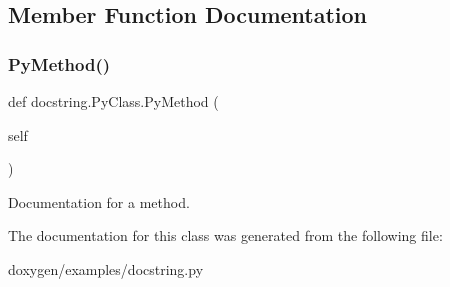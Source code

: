 \subsection{Member Function Documentation}
\mbox{\label{classdocstring_1_1_py_class_af092e1eacc10334e0e8630531a3473b4}} 
\subsubsection{\texorpdfstring{PyMethod()}{PyMethod()}}
{\footnotesize\ttfamily def docstring.\+Py\+Class.\+Py\+Method (\begin{DoxyParamCaption}\item[{}]{self }\end{DoxyParamCaption})}

\begin{DoxyVerb}Documentation for a method.\end{DoxyVerb}
 

The documentation for this class was generated from the following file\+:\begin{DoxyCompactItemize}
\item 
doxygen/examples/docstring.\+py\end{DoxyCompactItemize}
